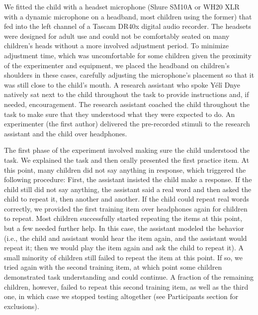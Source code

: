 \documentclass[english,,man,floatsintext]{apa6}
\begin{document}
We fitted the child with a headset microphone (Shure SM10A or WH20 XLR with a dynamic microphone on a headband, most children using the former) that fed into the left channel of a Tascam DR40x digital audio recorder. The headsets were designed for adult use and could not be comfortably seated on many children's heads without a more involved adjustment period. To minimize adjustment time, which was uncomfortable for some children given the proximity of the experimenter and equipment, we placed the headband on children's shoulders in these cases, carefully adjusting the microphone's placement so that it was still close to the child's mouth. A research assistant who spoke Yélî Dnye natively sat next to the child throughout the task to provide instructions and, if needed, encouragement. The research assistant coached the child throughout the task to make sure that they understood what they were expected to do. An experimenter (the first author) delivered the pre-recorded stimuli to the research assistant and the child over headphones.

The first phase of the experiment involved making sure the child understood the task. We explained the task and then orally presented the first practice item. At this point, many children did not say anything in response, which triggered the following procedure: First, the assistant insisted the child make a response. If the child still did not say anything, the assistant said a real word and then asked the child to repeat it, then another and another. If the child could repeat real words correctly, we provided the first training item over headphones again for children to repeat. Most children successfully started repeating the items at this point, but a few needed further help. In this case, the assistant modeled the behavior (i.e., the child and assistant would hear the item again, and the assistant would repeat it; then we would play the item again and ask the child to repeat it). A small minority of children still failed to repeat the item at this point. If so, we tried again with the second training item, at which point some children demonstrated task understanding and could continue. A fraction of the remaining children, however, failed to repeat this second training item, as well as the third one, in which case we stopped testing altogether (see Participants section for exclusions).
\end{document}
